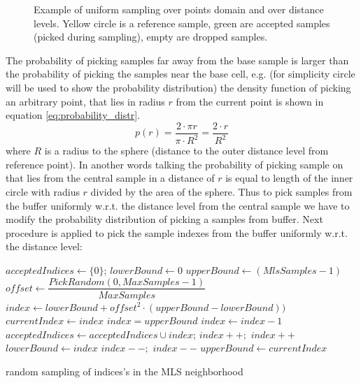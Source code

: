 \begin{figure}
\begin{center}
	\end{center}
	\caption{Example of uniform sampling over points domain and over distance levels. Yellow circle is a reference sample, green are accepted samples (picked during sampling), empty are dropped samples.}
	\label{fig:samples_distribution}
\end{figure}

The probability of picking samples far away from the base sample is larger than the probability of picking the samples near the base cell, e.g. (for simplicity circle will be used to show the probability distribution) the density function of picking an arbitrary point, that lies in radius $r$ from the current point is shown in equation \ref{eq:probability_distr}.
\begin{equation}
	p(r) = \dfrac{2 \cdot \pi r}{\pi \cdot R^2} = \dfrac{2 \cdot r}{R^2}
	\label{eq:probability_distr}
\end{equation}
where $R$ is a radius to the sphere (distance to the outer distance level from reference point). In another words talking the probability of picking sample on that lies from the central sample in a distance of $r$ is equal to length of the inner circle with radius $r$ divided by the area of the sphere.
Thus to pick samples from the buffer uniformly w.r.t. the distance level from the central sample we have to modify the probability distribution of picking a samples from buffer. Next procedure is applied to pick the sample indexes from the buffer uniformly w.r.t. the distance level:
\begin{algorithm}[H]
	\scriptsize
	\begin{algorithmic}
			\State $acceptedIndices \gets \{0\}$;
			\State $lowerBound \gets 0$
			\State $upperBound \gets (MlsSamples - 1)$
				\State $offset \gets \dfrac{PickRandom(0, MaxSamples - 1)}{MaxSamples}$
				\State $index \gets lowerBound + offset^2 \cdot (upperBound - lowerBound))$
				\State $currentIndex \gets index$
						\State $index = upperBound$
					\Else
						\State $index \gets index - 1$
					\EndIf
				\EndWhile
				\State $acceptedIndices \gets acceptedIndices \cup index$;
					\State $index++;$
						\State $index++$
					\EndWhile
					\State $lowerBound \gets index$
				\Else 
						\State $index--;$
							\State $index--$
						\EndWhile
						\State $upperBound \gets currentIndex$
					\EndIf
				\EndIf
			\EndFor
	\end{algorithmic}
	\caption{random sampling of indices's in the MLS neighborhood}
	\label{alg:mls_montecarlo_sampling}
\end{algorithm}
